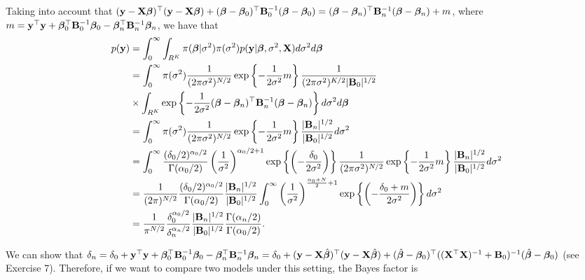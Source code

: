 Taking into account that $({\bf{y}}-{\bf{X}}\bm{\beta})^{\top}({\bf{y}}-{\bf{X}}\bm{\beta})+(\bm{\beta}-\bm{\beta}_0)^{\top}{\bf{B}}_0^{-1}(\bm{\beta}-\bm{\beta}_0)=(\bm{\beta}-\bm{\beta}_n)^{\top}{\bf{B}}_n^{-1}(\bm{\beta}-\bm{\beta}_n)+m$, where $m={\bf{y}}^{\top}{\bf{y}}+\bm{\beta}_0^{\top}{\bf{B}}_0^{-1}\bm{\beta}_0-\bm{\beta}_n^{\top}{\bf{B}}_n^{-1}\bm{\beta}_n$, we have that
{\footnotesize{
\begin{align*}
	p({\bf{y}})&=\int_0^{\infty}\int_{R^K}\pi (\bm{\beta} | \sigma^2)\pi(\sigma^2)p({\bf{y}}|\bm{\beta}, \sigma^2, {\bf{X}})d\sigma^2 d\bm{\beta}\\
	&=\int_0^{\infty}\pi(\sigma^2) \frac{1}{(2\pi\sigma^2)^{N/2}}\exp\left\{-\frac{1}{2\sigma^2}m \right\}   \frac{1}{(2\pi\sigma^2)^{K/2}|{\bf{B}}_0|^{1/2}}\\
	&\times\int_{R^K}\exp\left\{-\frac{1}{2\sigma^2}(\bm{\beta}-\bm{\beta}_n)^{\top}{\bf{B}}_n^{-1}(\bm{\beta}-\bm{\beta}_n)\right\}d\sigma^2 d\bm{\beta}\\
	&=\int_0^{\infty}\pi(\sigma^2) \frac{1}{(2\pi\sigma^2)^{N/2}}\exp\left\{-\frac{1}{2\sigma^2}m \right\}   \frac{|{\bf{B}}_n|^{1/2}}{|{\bf{B}}_0|^{1/2}}d\sigma^2\\
	&=\int_{0}^{\infty} \frac{(\delta_0/2)^{\alpha_0/2}}{\Gamma(\alpha_0/2)}\left(\frac{1}{\sigma^2}\right)^{\alpha_0/2+1}\exp\left\{\left(-\frac{\delta_0}{2\sigma^2}\right)\right\} \frac{1}{(2\pi\sigma^2)^{N/2}}\exp\left\{-\frac{1}{2\sigma^2}m \right\}   \frac{|{\bf{B}}_n|^{1/2}}{|{\bf{B}}_0|^{1/2}} d\sigma^2\\
	&= \frac{1}{(2\pi)^{N/2}}\frac{(\delta_0/2)^{\alpha_0/2}}{\Gamma(\alpha_0/2)}\frac{|{\bf{B}}_n|^{1/2}}{|{\bf{B}}_0|^{1/2}}\int_{0}^{\infty}\left(\frac{1}{\sigma^2}\right)^{\frac{\alpha_0+N}{2}+1}\exp\left\{\left(-\frac{\delta_0+m}{2\sigma^2}\right)\right\}d\sigma^2\\
	&= \frac{1}{\pi^{N/2}}\frac{\delta_0^{\alpha_0/2}}{\delta_n^{\alpha_n/2}}\frac{|{\bf{B}}_n|^{1/2}}{|{\bf{B}}_0|^{1/2}}\frac{\Gamma(\alpha_n/2)}{\Gamma(\alpha_0/2)}.
\end{align*}
}}

We can show that $\delta_n=\delta_0 + {\bf{y}}^{\top}{\bf{y}} + \bm{\beta}_0^{\top}{\bf{B}}_0^{-1}\bm{\beta}_0 - \bm{\beta}_n^{\top}{\bf{B}}_n^{-1}\bm{\beta}_n=\delta_0+({\bf{y}}-{\bf{X}}\hat{\bm{\beta}})^{\top}({\bf{y}}-{\bf{X}}\hat{\bm{\beta}})+(\hat{\bm{\beta}}-\bm{\beta}_0)^{\top}(({\bf{X}}^{\top}{\bf{X}})^{-1}+{\bf{B}}_0)^{-1}(\hat{\bm{\beta}}-\bm{\beta}_0)$ (see Exercise 7). Therefore, if we want to compare two models under this setting, the Bayes factor is

